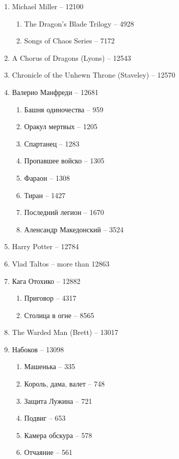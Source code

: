 \documentclass[a4paper, 11pt]{proc} %
\begin{document}
\begin{enumerate}
    \item Michael Miller -- 12100
        \begin{enumerate}
            \item The Dragon's Blade Trilogy -- 4928
            \item Songs of Chaos Series -- 7172
        \end{enumerate}
    \item A Chorus of Dragons (Lyons) -- 12543
    \item Chronicle of the Unhewn Throne (Staveley) -- 12570
    \item Валерио Манфреди -- 12681
        \begin{enumerate}
            \item Башня одиночества -- 959
            \item Оракул мертвых -- 1205
            \item Спартанец -- 1283
            \item Пропавшее войско -- 1305
            \item Фараон -- 1308
            \item Тиран -- 1427
            \item Последний легион -- 1670
            \item Аленсандр Македонский -- 3524
        \end{enumerate}
    \item Harry Potter -- 12784
    \item Vlad Taltos -- more than 12863
    \item Кага Отохико -- 12882
        \begin{enumerate}
            \item Приговор -- 4317
            \item Столица в огне -- 8565
        \end{enumerate}
    \item The Warded Man (Brett) -- 13017
    \item Набоков -- 13098
        \begin{enumerate}
            \item Машенька -- 335
            \item Король, дама, валет -- 748
            \item Защита Лужина -- 721
            \item Подвиг -- 653
            \item Камера обскура -- 578
            \item Отчаяние -- 561

\end{enumerate}
\end{enumerate}
\end{document}
